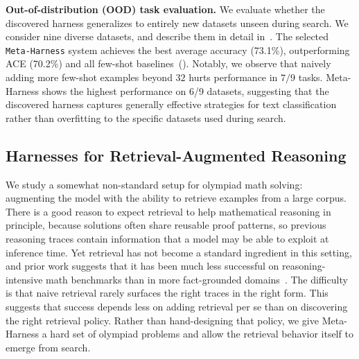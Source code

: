 \documentclass{article}
\newcommand{\ours}[1]{\texttt{#1}}
\begin{document}
\textbf{Out-of-distribution (OOD) task evaluation.}
We evaluate whether the discovered harness generalizes to entirely new datasets unseen during search.
We consider nine diverse datasets, and describe them in detail in~.
The selected \ours{Meta-Harness} system achieves the best average accuracy (73.1\%), outperforming ACE (70.2\%) and all few-shot baselines~().
Notably, we observe that naively adding more few-shot examples beyond $32$ hurts performance in $7/9$ tasks.
Meta-Harness shows the highest performance on 6/9 datasets, suggesting that the discovered harness captures generally effective strategies for text classification rather than overfitting to the specific datasets used during search.



\subsection{Harnesses for Retrieval-Augmented Reasoning}
\label{subsec:math-reasoning}

We study a somewhat non-standard setup for olympiad math solving: augmenting the model with the ability to retrieve examples from a large corpus.
There is a good reason to expect retrieval to help mathematical reasoning in principle, because solutions often share reusable proof patterns, so previous reasoning traces contain information that a model may be able to exploit at inference time.
Yet retrieval has not become a standard ingredient in this setting, and prior work suggests that it has been much less successful on reasoning-intensive math benchmarks than in more fact-grounded domains~\citep{shakya2026adaptiveretrievalhelpsreasoning,xiao2024rarbreasoningretrievalbenchmark,balunovic_srimatharena_2025}.
The difficulty is that naive retrieval rarely surfaces the right traces in the right form.
This suggests that success depends less on adding retrieval per se than on discovering the right retrieval policy.
Rather than hand-designing that policy, we give Meta-Harness a hard set of olympiad problems and allow the retrieval behavior itself to emerge from search.
\end{document}
